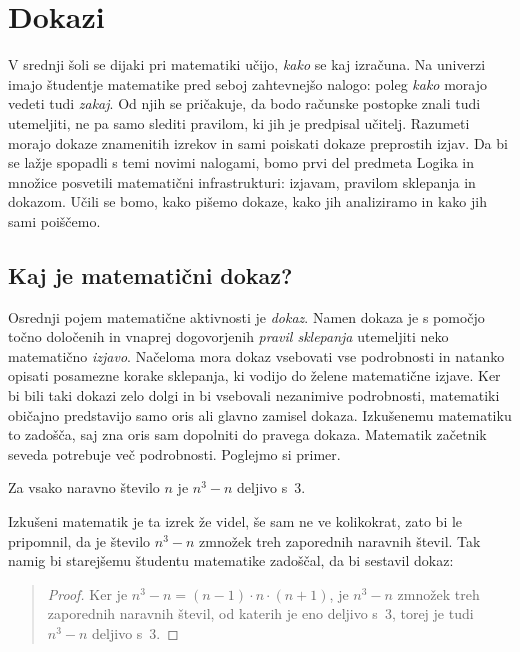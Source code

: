 \chapter{Dokazi}
\label{chap:dokazi}

V srednji šoli se dijaki pri matematiki učijo, \emph{kako} se kaj
izračuna. Na univerzi imajo študentje matematike pred seboj
zahtevnejšo nalogo: poleg \emph{kako} morajo vedeti tudi \emph{zakaj}.
Od njih se pričakuje, da bodo računske postopke znali tudi utemeljiti,
ne pa samo slediti pravilom, ki jih je predpisal učitelj. Razumeti
morajo dokaze znamenitih izrekov in sami poiskati dokaze preprostih
izjav. Da bi se lažje spopadli s temi novimi nalogami, bomo prvi del
predmeta Logika in množice posvetili matematični infrastrukturi:
izjavam, pra\-vi\-lom sklepanja in dokazom. Učili se bomo, kako pišemo
dokaze, kako jih analiziramo in kako jih sami poiščemo.

\section{Kaj je matematični dokaz?}
\label{sec:kaj-je-dokaz}

Osrednji pojem matematične aktivnosti je \emph{dokaz}. Namen dokaza je
s pomočjo točno določenih in vnaprej dogovorjenih \emph{pravil
  sklepanja} utemeljiti neko matematično \emph{izjavo}. Načeloma mora
dokaz vsebovati vse podrobnosti in natanko opisati posamezne korake
sklepanja, ki vodijo do želene matematične izjave. Ker bi bili taki
dokazi zelo dolgi in bi vsebovali nezanimive podrobnosti, matematiki
običajno predstavijo samo oris ali glavno zamisel dokaza. Izkušenemu
matematiku to zadošča, saj zna oris sam dopolniti do pravega dokaza.
Matematik začetnik seveda potrebuje več podrobnosti. Poglejmo si
primer.

\begin{izrek}
  \label{izr:n3-n-deljivo-3}
  Za vsako naravno število $n$ je $n^3 - n$ deljivo s~$3$.
\end{izrek}

\noindent
Izkušeni matematik je ta izrek že videl, še sam ne ve kolikokrat,
zato bi le pripomnil, da je število $n^3 - n$ zmnožek treh zaporednih
naravnih števil.
%
Tak namig bi starejšemu študentu matematike zadoščal, da bi sestavil dokaz:

\begin{quote}
  \begin{proof}
    Ker je $n^3 - n = (n-1) \cdot n \cdot (n+1)$, je $n^3 - n$ zmnožek
    treh zaporednih naravnih števil, od katerih je eno deljivo s~$3$,
    torej je tudi $n^3 - n$ deljivo s~$3$.
  \end{proof}
\end{quote}

